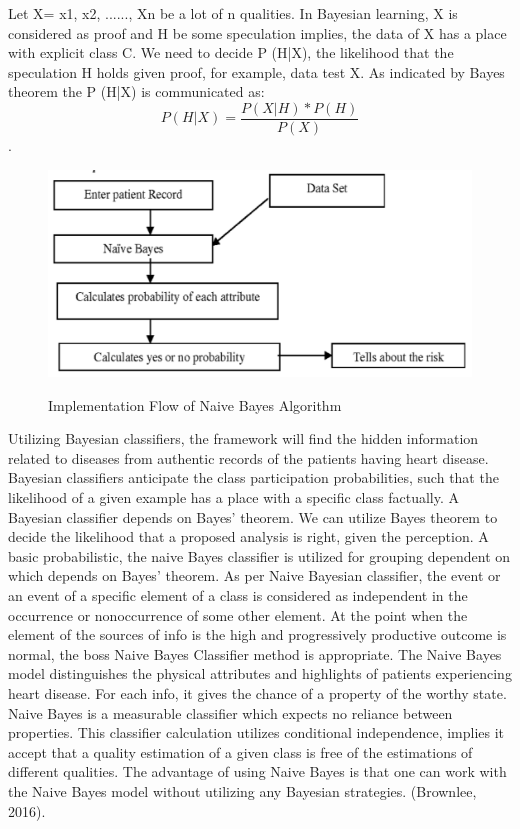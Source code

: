 \documentclass[oneside,12pt]{Classes/VTU}
\begin{document}
    	Let X= {x1, x2, ......, Xn} be a lot of n qualities. In Bayesian learning, X is considered as proof and H be some speculation implies, the data of X has a place with explicit class C. We need to decide P (H|X), the likelihood that the speculation H holds given proof, for example, data test X. As indicated by Bayes theorem the P (H|X) is communicated as: \\
    	\[P(H|X) = \frac{P(X|H) * P(H)}{P(X)}\].
    	
    	\begin{figure}[h]
    		\begin{center}
    			\includegraphics[width = 15cm]{images/naive_bayes.png}\\
    			\caption{Implementation Flow of Naive Bayes Algorithm}
    		\end{center}
    	\end{figure}
    	
       	Utilizing Bayesian classifiers, the framework will find the hidden information related to diseases from authentic records of the patients having heart disease. Bayesian classifiers anticipate the class participation probabilities, such that the likelihood of a given example has a place with a specific class factually. A Bayesian classifier depends on Bayes' theorem. We can utilize Bayes theorem to decide the likelihood that a proposed analysis is right, given the perception. A basic probabilistic, the naive Bayes classifier is utilized for grouping dependent on which depends on Bayes' theorem. As per Naive Bayesian classifier, the event or an event of a specific element of a class is considered as independent in the occurrence or nonoccurrence of some other element. At the point when the element of the sources of info is the high and progressively productive outcome is normal, the boss Naive Bayes Classifier method is appropriate. The Naive Bayes model distinguishes the physical attributes and highlights of patients experiencing heart disease. For each info, it gives the chance of a property of the worthy state. Naive Bayes is a measurable classifier which expects no reliance between properties. This classifier calculation utilizes conditional independence, implies it accept that a quality estimation of a given class is free of the estimations of different qualities. The advantage of using Naive Bayes is that one can work with the Naive Bayes model without utilizing any Bayesian strategies. (Brownlee, 2016). \\ 
       	
\end{document}
